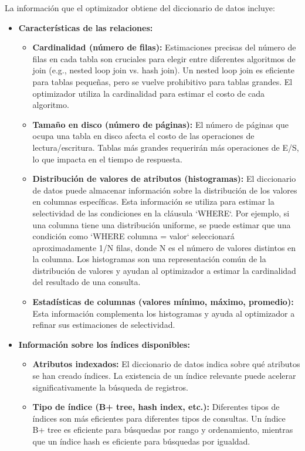 La información que el optimizador obtiene del diccionario de datos incluye:

\begin{itemize}
    \item \textbf{Características de las relaciones:}
    \begin{itemize}
        \item \textbf{Cardinalidad (número de filas):}  Estimaciones precisas del número de filas en cada tabla son cruciales para elegir entre diferentes algoritmos de join (e.g., nested loop join vs. hash join).  Un nested loop join es eficiente para tablas pequeñas, pero se vuelve prohibitivo para tablas grandes. El optimizador utiliza la cardinalidad para estimar el costo de cada algoritmo.
        \item \textbf{Tamaño en disco (número de páginas):}  El número de páginas que ocupa una tabla en disco afecta el costo de las operaciones de lectura/escritura. Tablas más grandes requerirán más operaciones de E/S, lo que impacta en el tiempo de respuesta.
        \item \textbf{Distribución de valores de atributos (histogramas):} El diccionario de datos puede almacenar información sobre la distribución de los valores en columnas específicas.  Esta información se utiliza para estimar la selectividad de las condiciones en la cláusula `WHERE`.  Por ejemplo, si una columna tiene una distribución uniforme, se puede estimar que una condición como `WHERE columna = valor` seleccionará aproximadamente 1/N filas, donde N es el número de valores distintos en la columna. Los histogramas son una representación común de la distribución de valores y ayudan al optimizador a estimar la cardinalidad del resultado de una consulta.
        \item \textbf{Estadísticas de columnas (valores mínimo, máximo, promedio):} Esta información complementa los histogramas y ayuda al optimizador a refinar sus estimaciones de selectividad.
    \end{itemize}
    \item \textbf{Información sobre los índices disponibles:}
    \begin{itemize}
        \item \textbf{Atributos indexados:} El diccionario de datos indica sobre qué atributos se han creado índices.  La existencia de un índice relevante puede acelerar significativamente la búsqueda de registros.
        \item \textbf{Tipo de índice (B+ tree, hash index, etc.):} Diferentes tipos de índices son más eficientes para diferentes tipos de consultas.  Un índice B+ tree es eficiente para búsquedas por rango y ordenamiento, mientras que un índice hash es eficiente para búsquedas por igualdad.

\end{itemize}
\end{itemize}

